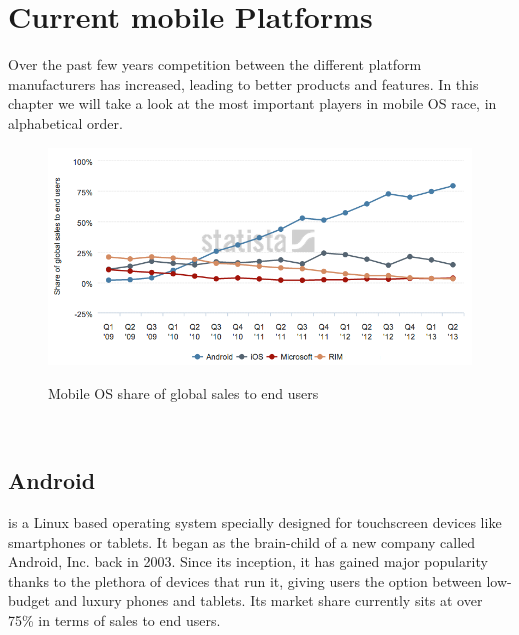 \chapter{Current mobile Platforms}\label{ch:m_plats}
Over the past few years competition between the different platform manufacturers has increased, leading to better products and features. In this chapter we will take a look at the most important players in mobile OS race, in alphabetical order.

\begin{figure}[H]
    \begin{center}
        {\includegraphics[width=1\linewidth]{gfx/statista-mobile}}
        \caption[Mobile OS share of global sales to end users]{Mobile OS share of global sales to end users\footnotemark}\label{fig:trend}
    \end{center}
\end{figure}
\\

\section{Android}
 is a Linux based operating system specially designed for touchscreen devices like smartphones or tablets. It began as the brain-child of a new company called Android, Inc. back in 2003. Since its inception, it has gained major popularity thanks to the plethora of devices that run it, giving users the option between low-budget and luxury phones and tablets. Its market share currently sits at over 75\% in terms of sales to end users.

